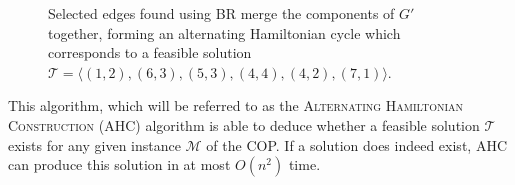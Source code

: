 \documentclass[runningheads]{llncs}
\begin{document}
\begin{figure}	
	\centering
	\begin{subfigure}[H]{0.57\textwidth}
		
		\label{fig:mpsconnect}
	\end{subfigure}
	\begin{subfigure}[H]{0.57\textwidth}
		
		\label{fig:mpscycle}
	\end{subfigure}
	\begin{subfigure}[H]{0.6\textwidth}
		
		\label{fig:mpspath}
	\end{subfigure}
	\caption{Selected edges found using BR merge the components of $G'$ together, forming an alternating Hamiltonian cycle which corresponds to a feasible solution $\mathcal{T} = \langle(1,2), (6,3), (5,3), (4,4), (4,2), (7,1) \rangle$.}
	\label{fig:connect/cycle}
\end{figure}

This algorithm, which will be referred to as the \textsc{Alternating Hamiltonian Construction} (AHC) algorithm is able to deduce whether a feasible solution $\mathcal{T}$ exists for any given instance $\mathcal{M}$ of the COP. If a solution does indeed exist, AHC can produce this solution in at most $O(n^2)$ time.
\end{document}
